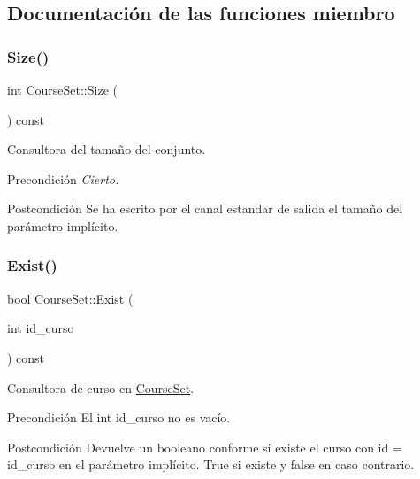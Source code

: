 \subsection{Documentación de las funciones miembro}
\mbox{\label{class_course_set_ac255028f38ba0b5b3ef1994e2a9a6c6f}} 
\subsubsection{\texorpdfstring{Size()}{Size()}}
{\footnotesize\ttfamily int Course\+Set\+::\+Size (\begin{DoxyParamCaption}{ }\end{DoxyParamCaption}) const}



Consultora del tamaño del conjunto. 

\begin{DoxyPrecond}{Precondición}
{\itshape Cierto.} 
\end{DoxyPrecond}
\begin{DoxyPostcond}{Postcondición}
Se ha escrito por el canal estandar de salida el tamaño del parámetro implícito. 
\end{DoxyPostcond}
\mbox{\label{class_course_set_a1ced9926115a2fbc8058982d148040f1}} 
\subsubsection{\texorpdfstring{Exist()}{Exist()}}
{\footnotesize\ttfamily bool Course\+Set\+::\+Exist (\begin{DoxyParamCaption}\item[{int}]{id\+\_\+curso }\end{DoxyParamCaption}) const}



Consultora de curso en \mbox{\hyperlink{class_course_set}{Course\+Set}}. 

\begin{DoxyPrecond}{Precondición}
El int id\+\_\+curso no es vacío. 
\end{DoxyPrecond}
\begin{DoxyPostcond}{Postcondición}
Devuelve un booleano conforme si existe el curso con id = id\+\_\+curso en el parámetro implícito. True si existe y false en caso contrario. 
\end{DoxyPostcond}
\mbox{\label{class_course_set_a3ad118865a697fbb3e5765fc6583346e}} 

